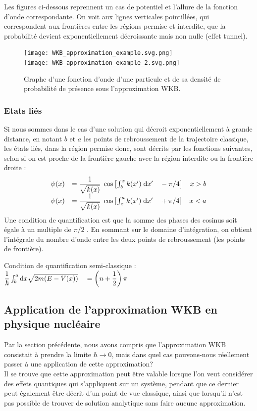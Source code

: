 \documentclass[12pt, a4paper]{book}
\begin{document}
Les figures ci-dessous reprennent un cas de potentiel et l'allure de la fonction d'onde correspondante. On voit aux lignes verticales pointillées, qui correspondent aux frontières entre les régions permise et interdite, que la probabilité devient exponentiellement décroissante mais non nulle (effet tunnel).
\begin{figure}[h]
  \centering
  \texttt{[image: WKB\_approximation\_example.svg.png]} \\ \texttt{[image: WKB\_approximation\_example\_2.svg.png]}
  \caption{Graphe d'une fonction d'onde d'une particule et de sa densité de probabilité de présence sous l'approximation WKB.}
\end{figure}

\subsubsection{Etats liés}
Si nous sommes dans le cas d'une solution qui décroit exponentiellement à grande distance, en notant $b$ et $a$ les points de rebroussement de la trajectoire classique, les états liés, dans la région permise donc, sont décrits par les fonctions suivantes, selon si on est proche de la frontière gauche avec la région interdite ou la frontière droite :
\begin{equation}
  \begin{array}{llr}
    \psi(x) &= \dfrac{1}{\sqrt{k(x)}} \; \cos\left[\int_b ^x k(x')\; \mathrm{d} x' \quad - \pi/4\right] & x>b \\   
    \psi(x) &= \dfrac{1}{\sqrt{k(x)}} \; \cos\left[\int_x ^a k(x')\; \mathrm{d} x' \quad + \pi/4\right] & x<a    
  \end{array}
\end{equation}
Une condition de quantification est que la somme des phases des cosinus soit égale à un multiple de $\pi/2$ . En sommant sur le domaine d'intégration, on obtient l'intégrale du nombre d'onde entre les deux points de rebroussement (les points de frontière).
\begin{center}
  Condition de quantification semi-classique : $\dfrac{1}{\hbar} \int_b ^a \mathrm{d}x \sqrt{2m(E-V(x))} \quad = \left(n+\dfrac{1}{2}\right) \pi$
\end{center}

\subsection{Application de l'approximation WKB en physique nucléaire}
Par la section précédente, nous avons compris que l'approximation WKB consistait à prendre la limite $\hbar \to 0$, mais dans quel cas pouvons-nous réellement passer à une application de cette approximation? \\
{\color{red}{Tentative d'explication mais le paragraphe en entier est à vérifier :}} Il se trouve que cette approximation peut être valable lorsque l'on veut considérer des effets quantiques qui s'appliquent sur un système, pendant que ce dernier peut également être décrit d'un point de vue classique, 
ainsi que lorsqu'il n'est pas possible de trouver de solution analytique sans faire aucune approximation. \\
\end{document}
